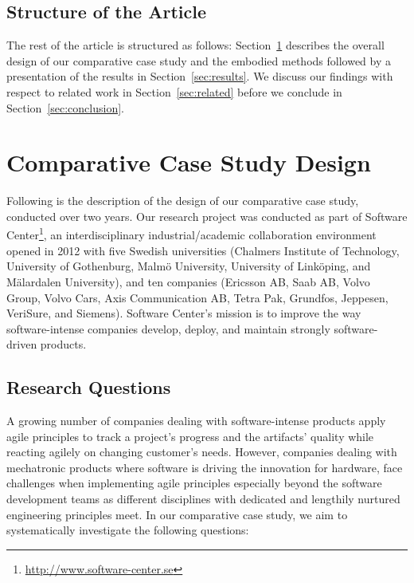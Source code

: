 \documentclass[10pt,a4paper]{IEEEtran} %
\begin{document}
\subsection{Structure of the Article}

The rest of the article is structured as follows: Section~\ref{sec:method} describes the overall design of our comparative case study and the embodied methods followed by a presentation of the results in Section~\ref{sec:results}. We discuss our findings with respect to related work in Section~\ref{sec:related} before we conclude in
Section~\ref{sec:conclusion}.




\section{Comparative Case Study Design} %
\label{sec:method}

Following is the description of the design of our comparative case study, conducted over two years. 
Our research project was conducted
as part of Software Center\footnote{\url{http://www.software-center.se}},
an interdisciplinary industrial/academic collaboration environment
opened in 2012 with five Swedish universities 
(Chalmers Institute of Technology,
University of Gothenburg, 
Malmö University, 
University of Linköping, and
Mälardalen University), and ten companies 
(Ericsson AB, 
Saab AB, 
Volvo Group,
Volvo Cars, 
Axis Communication AB, 
Tetra Pak, 
Grundfos, 
Jeppesen, 
VeriSure, and 
Siemens).
Software Center's mission is to improve the way software-intense companies develop, deploy, and maintain strongly software-driven products.


\subsection{Research Questions}
\label{sec:rq}
A growing number of companies dealing with software-intense products 
apply agile principles to track a project's progress and the artifacts' quality while reacting agilely on changing customer's needs. However, companies dealing with
mechatronic products where software is driving the innovation for hardware, face
challenges when
implementing agile principles especially beyond the software development teams
as different disciplines with dedicated and lengthily nurtured
engineering principles meet. In our comparative case study, we aim to systematically
investigate the following questions:
\end{document}
